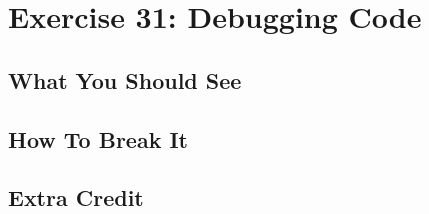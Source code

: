 \chapter{Exercise 31: Debugging Code}




\section{What You Should See}


\section{How To Break It}


\section{Extra Credit}



